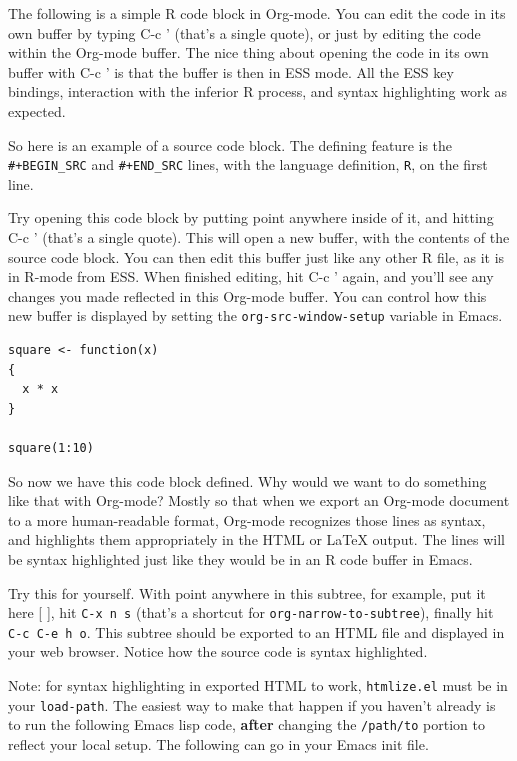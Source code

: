 \documentclass[11pt]{article}
\begin{document}
The following is a simple R code block in Org-mode. You can edit the
code in its own buffer by typing C-c ' (that's a single quote), or
just by editing the code within the Org-mode buffer. The nice thing
about opening the code in its own buffer with C-c ' is that the
buffer is then in ESS mode. All the ESS key bindings, interaction with
the inferior R process, and syntax highlighting work as expected.

So here is an example of a source code block. The defining feature is
the \texttt{\#+BEGIN\_SRC} and \texttt{\#+END\_SRC} lines, with the language definition,
\texttt{R}, on the first line.

Try opening this code block by putting point anywhere inside of it,
and hitting C-c ' (that's a single quote). This will open a new
buffer, with the contents of the source code block. You can then edit
this buffer just like any other R file, as it is in R-mode from
ESS. When finished editing, hit C-c ' again, and you'll see any
changes you made reflected in this Org-mode buffer. You can control
how this new buffer is displayed by setting the \texttt{org-src-window-setup}
variable in Emacs.

\begin{verbatim}
square <- function(x) 
{
  x * x
}
  
square(1:10)
\end{verbatim}

So now we have this code block defined. Why would we want to do
something like that with Org-mode? Mostly so that when we export an
Org-mode document to a more human-readable format, Org-mode recognizes
those lines as syntax, and highlights them appropriately in the HTML
or \LaTeX{} output. The lines will be syntax highlighted just like they
would be in an R code buffer in Emacs.

Try this for yourself. With point anywhere in this subtree, for
example, put it here [ ], hit \texttt{C-x n s} (that's a shortcut for
\texttt{org-narrow-to-subtree}), finally hit \texttt{C-c C-e h o}. This subtree
should be exported to an HTML file and displayed in your web
browser. Notice how the source code is syntax highlighted.

Note: for syntax highlighting in exported HTML to work, \texttt{htmlize.el}
must be in your \texttt{load-path}. The easiest way to make that happen if
you haven't already is to run the following Emacs lisp code, \textbf{after}
changing the \texttt{/path/to} portion to reflect your local setup. The
following can go in your Emacs init file.
\end{document}
